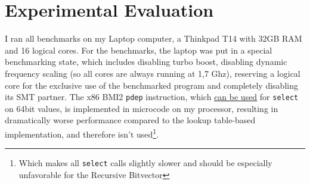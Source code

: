 \documentclass[a4paper,UKenglish,cleveref, autoref, thm-restate]{lipics-v2021}
\newcommand{\select} {\texttt{select}}
\begin{document}
\section{Experimental Evaluation}
\label{ch:Conclusion}
I ran all benchmarks on my Laptop computer, a Thinkpad T14 with 32GB RAM and 16 logical cores.
For the benchmarks, the laptop was put in a special benchmarking state, which includes disabling turbo boost,
disabling dynamic frequency scaling (so all cores are always running at 1,7 Ghz), reserving a logical core for the exclusive use
of the benchmarked program and completely disabling its SMT partner.
The x86 BMI2 \texttt{pdep} instruction, which \href{https://stackoverflow.com/questions/7669057/find-nth-set-bit-in-an-int/27453505#27453505}{can be used} for \select{} on 64bit values, is implemented in microcode on my processor, resulting in dramatically worse performance compared to the lookup table-based implementation, and therefore isn't used\footnote{Which makes all \select{} calls slightly slower
and should be especially unfavorable for the Recursive Bitvector}.


\end{document}
